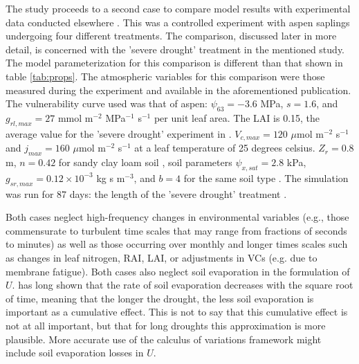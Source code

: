 \documentclass[utf8]{frontiersSCNS} %
\begin{document}
The study proceeds to a second case to compare model results with experimental data conducted elsewhere \citep{venturas_2018}. This was a controlled experiment with aspen saplings undergoing four different treatments. The comparison, discussed later in more detail, is concerned with the 'severe drought' treatment in the mentioned study. The model parameterization for this comparison is different than that shown in table \ref{tab:props}. The atmospheric variables for this comparison were those measured during the experiment and available in the aforementioned publication. The vulnerability curve used was that of aspen: $\psi_{63} = -3.6$ MPa, $s=1.6$, and $g_{rl,max} = 27$ mmol m$^{-2}$ MPa$^{-1}$ s$^{-1}$ per unit leaf area. The LAI is 0.15, the average value for the 'severe drought' experiment in \citep{venturas_2018}. $V_{c,max} = 120$ $\mu$mol m$^{-2}$ s$^{-1}$ and $j_{max} = 160$ $\mu$mol m$^{-2}$ s$^{-1}$ at a leaf temperature of 25 degrees celsius. $Z_r = 0.8$ m, $n = 0.42$ for sandy clay loam soil \cite{clapp_empirical_1978}, soil parameters $\psi_{x,sat} = 2.8$ kPa, $g_{sr,max} = 0.12 \times 10^{-3}$ kg s m$^{-3}$, and $b = 4$ for the same soil type \citep{campbell_introduction_2012}. The simulation was run for 87 days: the length of the 'severe drought' treatment \citep{venturas_2018}.

Both cases neglect high-frequency changes in environmental variables (e.g., those commensurate to turbulent time scales that may range from fractions of seconds to minutes) as well as those occurring over monthly and longer times scales such as changes in leaf nitrogen, RAI, LAI, or adjustments in VCs (e.g. due to membrane fatigue). Both cases also neglect soil evaporation in the formulation of $U$. \citet{gardner_1959} has long shown that the rate of soil evaporation decreases with the square root of time, meaning that the longer the drought, the less soil evaporation is important as a cumulative effect. This is not to say that this cumulative effect is not at all important, but that for long droughts this approximation is more plausible. More accurate use of the calculus of variations framework might include soil evaporation losses in $U$.
\end{document}
